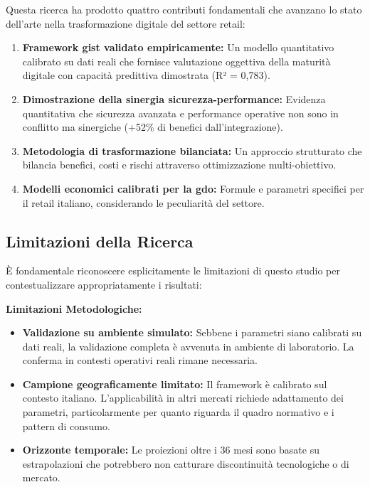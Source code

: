 Questa ricerca ha prodotto quattro contributi fondamentali che avanzano lo stato dell'arte nella trasformazione digitale del settore retail:

\begin{enumerate}
\item \textbf{Framework \gls{gist} validato empiricamente:} Un modello quantitativo calibrato su dati reali che fornisce valutazione oggettiva della maturità digitale con capacità predittiva dimostrata (R² = 0,783).

\item \textbf{Dimostrazione della sinergia sicurezza-performance:} Evidenza quantitativa che sicurezza avanzata e performance operative non sono in conflitto ma sinergiche (+52\% di benefici dall'integrazione).

\item \textbf{Metodologia di trasformazione bilanciata:} Un approccio strutturato che bilancia benefici, costi e rischi attraverso ottimizzazione multi-obiettivo.

\item \textbf{Modelli economici calibrati per la \gls{gdo}:} Formule e parametri specifici per il retail italiano, considerando le peculiarità del settore.
\end{enumerate}

\subsection{\texorpdfstring{Limitazioni della Ricerca}{5.6.2 - Limitazioni della Ricerca}}
\label{subsec:5.6.2}

È fondamentale riconoscere esplicitamente le limitazioni di questo studio per contestualizzare appropriatamente i risultati:

\textbf{Limitazioni Metodologiche:}
\begin{itemize}
\item \textbf{Validazione su ambiente simulato:} Sebbene i parametri siano calibrati su dati reali, la validazione completa è avvenuta in ambiente di laboratorio. La conferma in contesti operativi reali rimane necessaria.

\item \textbf{Campione geograficamente limitato:} Il framework è calibrato sul contesto italiano. L'applicabilità in altri mercati richiede adattamento dei parametri, particolarmente per quanto riguarda il quadro normativo e i pattern di consumo.

\item \textbf{Orizzonte temporale:} Le proiezioni oltre i 36 mesi sono basate su estrapolazioni che potrebbero non catturare discontinuità tecnologiche o di mercato.
\end{itemize}

